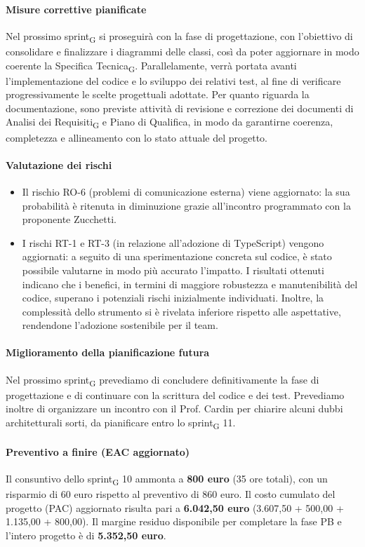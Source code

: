 \documentclass[11pt,a4paper]{article}
\newcommand{\gls}[1]{#1\textsubscript{G}}
\begin{document}
\paragraph{Misure correttive pianificate}
Nel prossimo \gls{sprint} si proseguirà con la fase di progettazione, con l’obiettivo di consolidare e finalizzare i diagrammi delle classi, così da poter aggiornare in modo coerente la \gls{Specifica Tecnica}. Parallelamente, verrà portata avanti l’implementazione del codice e lo sviluppo dei relativi test, al fine di verificare progressivamente le scelte progettuali adottate.
Per quanto riguarda la documentazione, sono previste attività di revisione e correzione dei documenti di \gls{Analisi dei Requisiti} e Piano di Qualifica, in modo da garantirne coerenza, completezza e allineamento con lo stato attuale del progetto.

\paragraph{Valutazione dei rischi}
\begin{itemize}
\item Il rischio RO-6 (problemi di comunicazione esterna) viene aggiornato: la sua probabilità è ritenuta in diminuzione grazie all’incontro programmato con la proponente Zucchetti.
\item I rischi RT-1 e RT-3 (in relazione all'adozione di TypeScript) vengono aggiornati: a seguito di una sperimentazione concreta sul codice, è stato possibile valutarne in modo più accurato l’impatto. I risultati ottenuti indicano che i benefici, in termini di maggiore robustezza e manutenibilità del codice, superano i potenziali rischi inizialmente individuati. Inoltre, la complessità dello strumento si è rivelata inferiore rispetto alle aspettative, rendendone l’adozione sostenibile per il team.
\end{itemize}
 
\paragraph{Miglioramento della pianificazione futura}
Nel prossimo \gls{sprint} prevediamo di concludere definitivamente la fase di progettazione e di continuare con la scrittura del codice e dei test. Prevediamo inoltre di organizzare un incontro con il Prof. Cardin per chiarire alcuni dubbi architetturali sorti, da pianificare entro lo \gls{sprint} 11.
 
\paragraph{Preventivo a finire (EAC aggiornato)}
Il consuntivo dello \gls{sprint} 10 ammonta a \textbf{800 euro} (35 ore totali), con un risparmio di 60 euro rispetto al preventivo di 860 euro.
Il costo cumulato del progetto (PAC) aggiornato risulta pari a \textbf{6.042,50 euro} (3.607,50 + 500,00 + 1.135,00 + 800,00). 
Il margine residuo disponibile per completare la fase PB e l'intero progetto è di \textbf{5.352,50 euro}.
\end{document}
